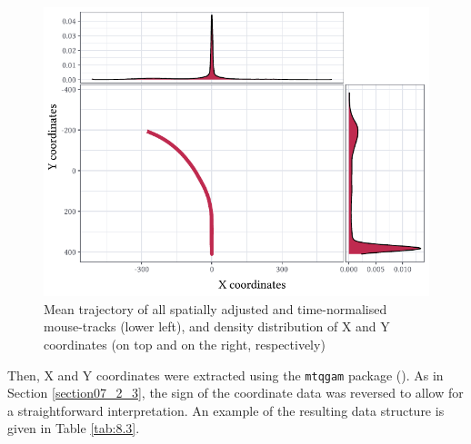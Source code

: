 \begin{figure}
    \centering
    \includegraphics[]{figures/fig8.2.pdf}
    \caption{Mean trajectory of all spatially adjusted and time-normalised mouse-tracks (lower left), and density distribution of X and Y coordinates (on top and on the right, respectively)}
    \label{fig:8_2}
\end{figure}

Then, X and Y coordinates were extracted using the \texttt{mtqgam} package (\cite{Schmitz2021mtqgam}). As in Section \ref{section07_2_3}, the sign of the coordinate data was reversed to allow for a straightforward interpretation. An example of the resulting data structure is given in Table \ref{tab:8.3}.

